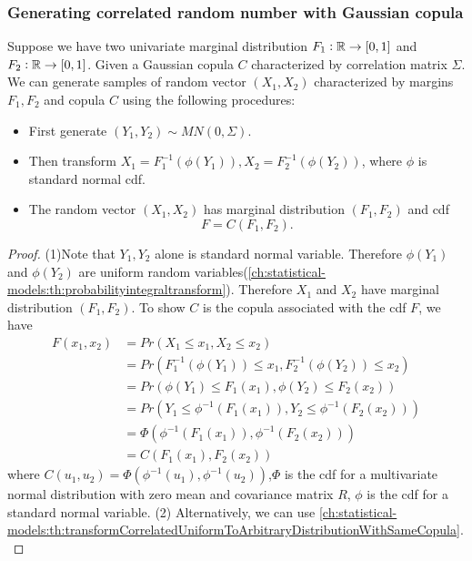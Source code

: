 \begin{refsection}
\subsubsection{Generating correlated random number with Gaussian copula}


\begin{theorem}
	Suppose we have two univariate marginal distribution $F_1:\mathbb{R}\to [0,1]$ and $F_2:\mathbb{R}\to [0,1]$. Given a Gaussian copula $C$ characterized by correlation matrix  $\Sigma$. 	
	We can generate samples of random vector $(X_1,X_2)$  characterized by margins $F_1,F_2$ and copula $C$ using the following procedures:
	\begin{itemize}
		\item First generate $(Y_1,Y_2) \sim MN(0,\Sigma)$.
		\item Then transform $X_1 = F_1^{-1}(\phi(Y_1)),X_2 = F_2^{-1}(\phi(Y_2))$, where $\phi$ is standard normal cdf.
		\item The random vector $(X_1,X_2)$ has marginal distribution  $(F_1,F_2)$ and cdf
		$$F = C(F_1,F_2).$$
		
	\end{itemize}
\end{theorem}
\begin{proof}
	(1)Note that $Y_1,Y_2$ alone is standard normal variable. Therefore $\phi(Y_1)$ and $\phi(Y_2)$ are uniform random variables(\autoref{ch:statistical-models:th:probabilityintegraltransform}). Therefore $X_1$	and $X_2$ have marginal distribution $(F_1,F_2)$.
	To show $C$ is the copula associated with the cdf $F$, we have
	\begin{align*}
	F(x_1,x_2) &= Pr(X_1\leq x_1, X_2\leq x_2) \\
	&= Pr(F_1^{-1}(\phi(Y_1)) \leq x_1, F_2^{-1}(\phi(Y_2)) \leq x_2) \\
	&=Pr(\phi(Y_1) \leq F_1(x_1), \phi(Y_2) \leq F_2(x_2)) \\
	&=Pr(Y_1 \leq \phi^{-1}(F_1(x_1)),Y_2 \leq \phi^{-1}(F_2(x_2))) \\
	&=\Phi(\phi^{-1}(F_1(x_1)),\phi^{-1}(F_2(x_2))) \\
	&= C(F_1(x_1),F_2(x_2))
	\end{align*}
	where $C(u_1,u_2) = \Phi(\phi^{-1}(u_1),\phi^{-1}(u_2))$,$\Phi$ is the cdf for a multivariate normal distribution with zero mean and covariance matrix $R$, $\phi$ is the cdf for a standard normal variable.
	(2) Alternatively, we can use \autoref{ch:statistical-models:th:transformCorrelatedUniformToArbitraryDistributionWithSameCopula}.
\end{proof}




\end{refsection}
